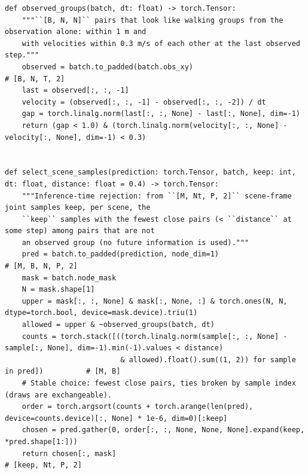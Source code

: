\documentclass[10pt]{article}
\begin{document}
\begin{lstlisting}[aboveskip=2pt]
def observed_groups(batch, dt: float) -> torch.Tensor:
    """``[B, N, N]`` pairs that look like walking groups from the observation alone: within 1 m and
    with velocities within 0.3 m/s of each other at the last observed step."""
    observed = batch.to_padded(batch.obs_xy)                           # [B, N, T, 2]
    last = observed[:, :, -1]
    velocity = (observed[:, :, -1] - observed[:, :, -2]) / dt
    gap = torch.linalg.norm(last[:, :, None] - last[:, None], dim=-1)
    return (gap < 1.0) & (torch.linalg.norm(velocity[:, :, None] - velocity[:, None], dim=-1) < 0.3)


def select_scene_samples(prediction: torch.Tensor, batch, keep: int, dt: float, distance: float = 0.4) -> torch.Tensor:
    """Inference-time rejection: from ``[M, Nt, P, 2]`` scene-frame joint samples keep, per scene, the
    ``keep`` samples with the fewest close pairs (< ``distance`` at some step) among pairs that are not
    an observed group (no future information is used)."""
    pred = batch.to_padded(prediction, node_dim=1)                     # [M, B, N, P, 2]
    mask = batch.node_mask
    N = mask.shape[1]
    upper = mask[:, :, None] & mask[:, None, :] & torch.ones(N, N, dtype=torch.bool, device=mask.device).triu(1)
    allowed = upper & ~observed_groups(batch, dt)
    counts = torch.stack([((torch.linalg.norm(sample[:, :, None] - sample[:, None], dim=-1).min(-1).values < distance)
                           & allowed).float().sum((1, 2)) for sample in pred])          # [M, B]
    # Stable choice: fewest close pairs, ties broken by sample index (draws are exchangeable).
    order = torch.argsort(counts + torch.arange(len(pred), device=counts.device)[:, None] * 1e-6, dim=0)[:keep]
    chosen = pred.gather(0, order[:, :, None, None, None].expand(keep, *pred.shape[1:]))
    return chosen[:, mask]                                             # [keep, Nt, P, 2]
\end{lstlisting}
\end{document}
